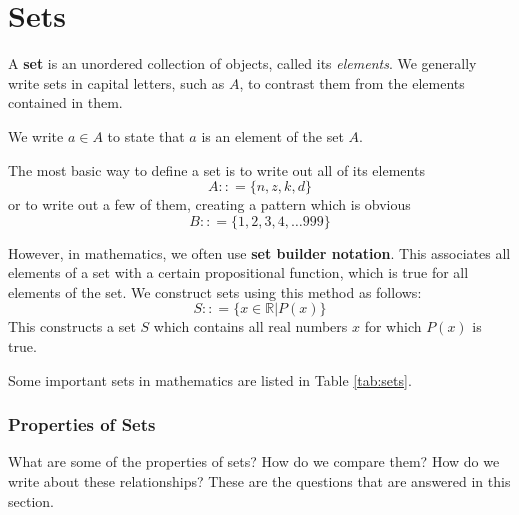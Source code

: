 \chapter{Sets}
\label{ch:sets}
A \textbf{set} is an unordered collection of objects, called its \emph{elements}. We generally write sets in capital letters, such as $A$, to contrast them from the elements contained in them.

We write $a \in A$ to state that $a$ is an element of the set $A$.

The most basic way to define a set is to write out all of its elements
\[ A : : = \{ n, z, k, d \} \]
or to write out a few of them, creating a pattern which is obvious
\[ B : : = \{ 1, 2, 3, 4, \ldots 999 \} \]

However, in mathematics, we often use \textbf{set builder notation}.
This associates all elements of a set with a certain propositional function, which is true for all elements of the set.
We construct sets using this method as follows:
\[ S : : = \big\{ x\in\mathbb R \big| P(x)\big\} \]
This constructs a set $S$ which contains all real numbers $x$ for which $P(x)$ is true.

Some important sets in mathematics are listed in Table \ref{tab:sets}.
\begin{table}
  \centering
  \caption{Important sets.}
  \label{tab:sets}
\end{table}

\subsection{Properties of Sets}

What are some of the properties of sets?
How do we compare them?
How do we write about these relationships?
These are the questions that are answered in this section.


